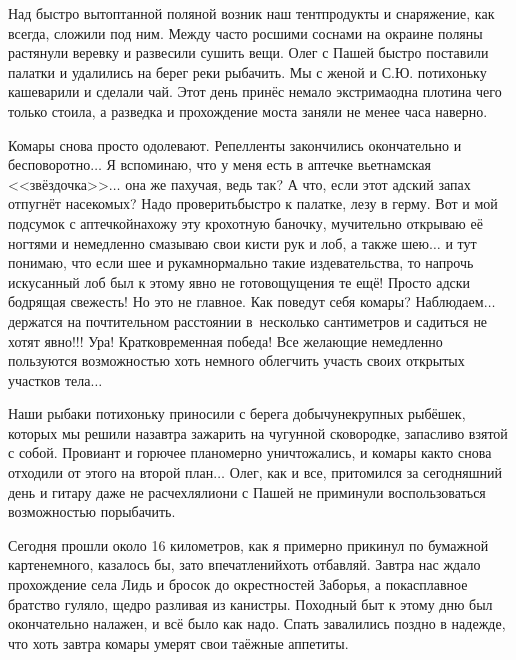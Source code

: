 Над быстро вытоптанной поляной возник наш тент\mdash продукты и снаряжение, как всегда, сложили под ним. Между часто росшими соснами на окраине поляны растянули веревку и развесили сушить вещи. Олег с Пашей быстро поставили палатки и удалились на берег реки рыбачить. Мы с женой и С.Ю. потихоньку кашеварили и сделали чай. Этот день принёс немало экстрима\mdash одна плотина чего только стоила, а разведка и прохождение моста заняли не менее часа наверно. 

Комары снова просто одолевают. Репелленты закончились окончательно и бесповоротно$\ldots$ Я вспоминаю, что у меня есть в аптечке вьетнамская <<звёздочка>>$\ldots$ она же пахучая, ведь так? А что, если этот адский запах отпугнёт насекомых? Надо проверить\mdash быстро к палатке, лезу в герму. Вот и мой подсумок с аптечкой\mdash нахожу эту крохотную баночку, мучительно открываю её ногтями и немедленно смазываю свои кисти рук и лоб, а также шею$\ldots$ и тут понимаю, что если шее и рукам\mdash нормально такие издевательства, то напрочь искусанный лоб был к этому явно не готов\mdash ощущения те ещё! Просто адски бодрящая свежесть! Но это не главное. Как поведут себя комары? Наблюдаем$\ldots$ держатся на почтительном расстоянии в~несколько сантиметров и садиться не хотят явно!!! Ура! Кратковременная победа! Все желающие немедленно пользуются возможностью хоть немного облегчить участь своих открытых участков тела$\ldots$

Наши рыбаки потихоньку приносили с берега добычу\mdash некрупных рыбёшек, которых мы решили назавтра зажарить на чугунной сковородке, запасливо взятой с собой. Провиант и горючее планомерно уничтожались, и комары как\sdash то снова отходили от этого на второй план$\ldots$ Олег, как и все, притомился за сегодняшний день и гитару даже не расчехляли\mdash они с Пашей не приминули воспользоваться возможностью порыбачить. 

Сегодня прошли около 16 километров, как я примерно прикинул по бумажной карте\mdash немного, казалось бы, зато впечатлений\mdash хоть отбавляй. Завтра нас ждало прохождение села Лидь и бросок до окрестностей Заборья, а пока\mdash сплавное братство гуляло, щедро разливая из канистры. Походный быт к этому дню был окончательно налажен, и всё было как надо. Спать завалились поздно в надежде, что хоть завтра комары умерят свои таёжные аппетиты.

\begin{center}
\end{center}
